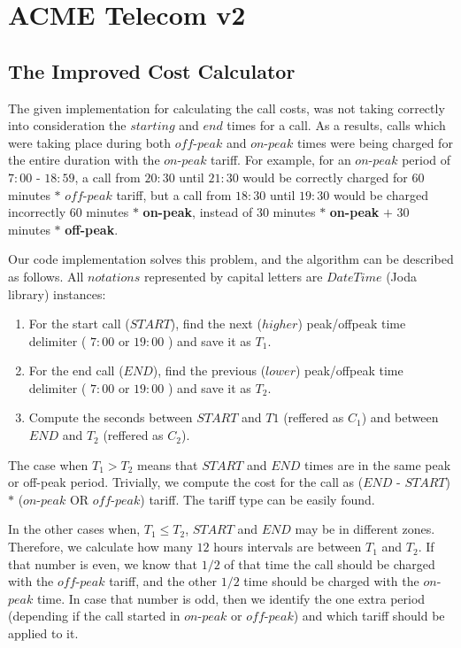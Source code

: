\documentclass[11pt,twocolumn]{article} %
\begin{document}
\section{ACME Telecom v2}

\subsection{The Improved Cost Calculator}

The given implementation for calculating the call costs, was not taking correctly into consideration 
the $starting$ and $end$ times for a call. As a results, calls which were taking place during both $off$-$peak$ and 
$on$-$peak$ times were being charged for the entire duration with the $on$-$peak$ tariff. For example, for an $on$-$peak$
period of $7:00$ - $18:59$, a call from $20:30$ until $21:30$ would be correctly charged for $60$ minutes $\ast$
$off$-$peak$ tariff, but a call from  $18:30$ until $19:30$ would be charged incorrectly $60$ minutes $\ast$ \textbf{on-peak},
instead of $30$ minutes $\ast$ \textbf{on-peak} $+$ 30 minutes $\ast$ \textbf{off-peak}.

Our code implementation solves this problem, and the algorithm can be described as follows. All $notations$ represented by capital letters 
are $DateTime$ (Joda library) instances:
\begin{enumerate}
\item{For the start call ($START$), find the next ($higher$) peak/offpeak time delimiter ( $7:00$ or $19:00$ ) and save it as $T_1$.}

\item{For the end call ($END$), find the previous ($lower$) peak/offpeak time delimiter ( $7:00$ or $19:00$ ) and save it as $T_2$.}

\item{Compute the seconds between $START$ and $T1$ (reffered as $C_1$) and between $END$ and $T_2$ (reffered as $C_2$).}


\end{enumerate}

The case when $T_1 > T_2$ means that $START$ and $END$ times are in the same peak or off-peak period. Trivially, we compute the 
cost for the call as ($END$ - $START$) $\ast$ ($on$-$peak$ OR $off$-$peak$) tariff. The tariff type can be easily found. 

In the other cases when, $T_1 \leq T_2$, $START$ and $END$ may be in different zones. Therefore, we calculate how many $12$ hours intervals are between $T_1$ and $T_2$.
If that number is even,  we know that $1/2$ of that time the call should be 
charged with the $off$-$peak$ tariff, and the other $1/2$ time should be charged with the $on$-$peak$ time. 
In case that number is odd, then we identify the one extra period (depending if the call started in $on$-$peak$ or $off$-$peak$) and which tariff should be applied to it.
\end{document}
